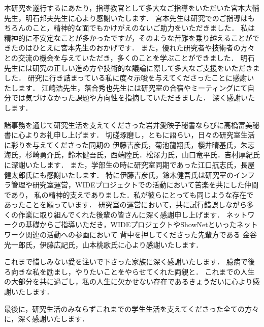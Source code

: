 本研究を遂行するにあたり，指導教官として多大なご指導をいただいた宮本大輔先生，明石邦夫先生に心より感謝いたします．
宮本先生は研究でのご指導はもちろんのこと，精神的な面でもかけがえのないご助力をいただきました．
私は精神的に不安定なことが多かったですが，そのような苦難を乗り越えることができたのはひとえに宮本先生のおかげです．
また，優れた研究者や技術者の方々との交流の機会を与えていただき，多くのことを学ぶことができました．
明石先生には研究の正しい進め方や技術的な議論に際して多大なご支援をいただきました．
研究に行き詰まっている私に度々示唆を与えてくださったことに感謝いたします．
江崎浩先生，落合秀也先生には研究室の合宿やミーティングにて自分では気づけなかった課題や方向性を指摘していただきました．
深く感謝いたします．

諸事務を通じて研究生活を支えてくださった岩井愛映子秘書ならびに高橋富美秘書に心よりお礼申し上げます．
切磋琢磨し，ともに語らい，日々の研究室生活に彩りを与えてくださった同期の
伊藤吉彦氏，菊池龍翔氏，櫻井晴基氏，朱志海氏，杉崎勇介氏，鈴木健吾氏，西端陸氏．松澤力氏，山口竜平氏．吉村厚紀氏
に深謝いたします．
また，学部生の時に研究室同期であった江口航志氏，長屋健太郎氏にも感謝いたします．
特に伊藤吉彦氏，鈴木健吾氏は研究室のインフラ管理や研究室運営，WIDEプロジェクトでの活動において苦楽を共にした仲間であり，
私の精神的支えでありました．私が彼らにとっても同じような存在であったことを願っています．
研究室の運営において，共に試行錯誤しながら多くの作業に取り組んでくれた後輩の皆さんに深く感謝申し上げます．
ネットワークの基礎からご指導いただき，WIDEプロジェクトやShowNetといったネットワーク関連の活動への参画において
背中を押してくださった先輩方である
金谷光一郎氏，伊藤広記氏，山本桃歌氏に心より感謝いたします．

これまで惜しみない愛を注いで下さった家族に深く感謝いたします．
臆病で後ろ向きな私を励まし，やりたいことをやらせてくれた両親と．
これまでの人生の大部分を共に過ごし，私の人生に欠かせない存在であるきょうだいに心より感謝いたします．

最後に，研究生活のみならずこれまでの学生生活を支えてくださった全ての方々に，深く感謝いたします．
